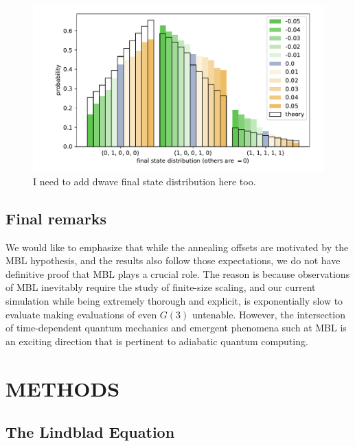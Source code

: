 \documentclass[prd,twocolumn,tightenlines,preprintnumbers,showpacs,superscriptaddress,notitlepage,nofootinbib,eqsecnum,
floatfix,longbibliography,aps,10pt]{revtex4-2}
\begin{document}
\begin{figure}
	\centering
	\includegraphics[width=\columnwidth]{./new_figures/final_state_distribution.pdf}
	\caption{{\color{red}I need to add dwave final state distribution here too.}}
	\label{fig:final_state_distribution}
\end{figure}

\subsection{Final remarks}
We would like to emphasize that while the annealing offsets are motivated by the MBL hypothesis, and the results also follow those expectations, we do not have definitive proof that MBL plays a crucial role. The reason is because observations of MBL inevitably require the study of finite-size scaling, and our current simulation while being extremely thorough and explicit, is exponentially slow to evaluate making evaluations of even $G(3)$ untenable. However, the intersection of time-dependent quantum mechanics and emergent phenomena such at MBL is an exciting direction that is pertinent to adiabatic quantum computing.


\section{METHODS}
\subsection{The Lindblad Equation}
\label{sec:methods:lindblad}
\end{document}
